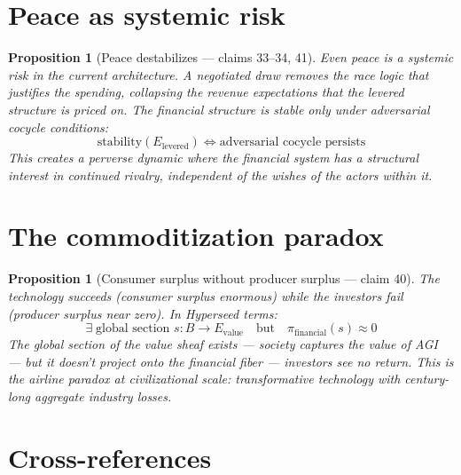 \documentclass[11pt,a4paper]{article}
\newtheorem{proposition}[definition]{Proposition}
\begin{document}

\section{Peace as systemic risk}
\label{sec:peace}

\begin{proposition}[Peace destabilizes --- claims 33--34, 41]
\label{prop:peace}
Even peace is a systemic risk in the current architecture. A negotiated
draw removes the race logic that justifies the spending, collapsing the
revenue expectations that the levered structure is priced on. The
financial structure is stable only under adversarial cocycle conditions:
\[
  \text{stability}(E_{\text{levered}}) \iff
  \text{adversarial cocycle persists}
\]
This creates a perverse dynamic where the financial system has a
structural interest in continued rivalry, independent of the wishes
of the actors within it.
\end{proposition}


\section{The commoditization paradox}
\label{sec:commoditization}

\begin{proposition}[Consumer surplus without producer surplus --- claim 40]
\label{prop:commodity}
The technology succeeds (consumer surplus enormous) while the investors
fail (producer surplus near zero). In Hyperseed terms:
\[
  \exists\; \text{global section } s : B \to E_{\text{value}}
  \quad\text{but}\quad
  \pi_{\text{financial}}(s) \approx 0
\]
The global section of the value sheaf exists --- society captures the
value of AGI --- but it doesn't project onto the financial fiber ---
investors see no return. This is the airline paradox at civilizational
scale: transformative technology with century-long aggregate industry losses.
\end{proposition}


\section{Cross-references}
\end{document}
